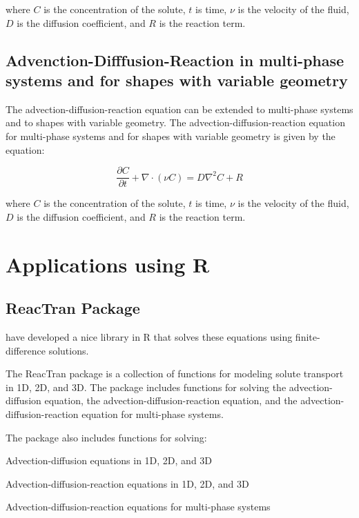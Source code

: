 \documentclass{tufte-handout}\usepackage[]{graphicx}\usepackage[]{xcolor}
\newenvironment{itemize*}%
  {\begin{itemize}%
    \setlength{\itemsep}{0pt}%
    \setlength{\parskip}{0pt}}%
  {\end{itemize}}
\begin{document}
where $C$ is the concentration of the solute, $t$ is time, $\nu$ is the velocity of the fluid, $D$ is the diffusion coefficient, and $R$ is the reaction term.

  
\subsection{Advenction-Difffusion-Reaction in multi-phase systems and for shapes with variable geometry}

The advection-diffusion-reaction equation can be extended to multi-phase systems and to shapes with variable geometry. The advection-diffusion-reaction equation for multi-phase systems and for shapes with variable geometry is given by the equation:

\begin{equation}
\frac{\partial C}{\partial t} + \nabla \cdot (\nu C) = D \nabla^2 C + R
\end{equation}

where $C$ is the concentration of the solute, $t$ is time, $\nu$ is the velocity of the fluid, $D$ is the diffusion coefficient, and $R$ is the reaction term.
  
\section{Applications using R}

\subsection{ReacTran Package}

\citet{soetaert2017package} have developed a nice library in R that solves these equations using finite-difference solutions. 

The ReacTran package is a collection of functions for modeling solute transport in 1D, 2D, and 3D. The package includes functions for solving the advection-diffusion equation, the advection-diffusion-reaction equation, and the advection-diffusion-reaction equation for multi-phase systems. 

The package also includes functions for solving:

\begin{itemize*}
\item Advection-diffusion equations in 1D, 2D, and 3D 
\item Advection-diffusion-reaction equations in 1D, 2D, and 3D
\item Advection-diffusion-reaction equations for multi-phase systems
\end{itemize*}
\end{document}
